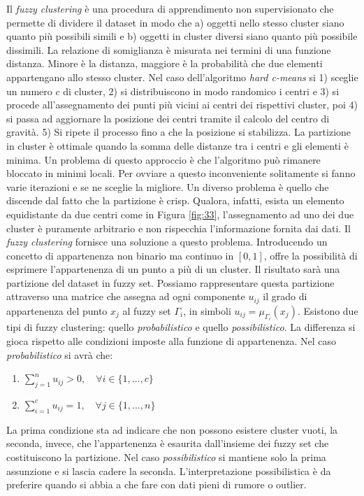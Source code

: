 \documentclass[10pt,a4paper]{article}
\begin{document}
Il \emph{fuzzy clustering} è una procedura di apprendimento non supervisionato che permette di dividere il dataset in modo che a) oggetti nello stesso cluster siano quanto più possibili simili e b) oggetti in cluster diversi siano quanto più possibile dissimili. La relazione di somiglianza è misurata nei termini di una funzione distanza. Minore è la distanza, maggiore è la probabilità che due elementi appartengano allo stesso cluster. Nel caso dell'algoritmo \emph{hard c-means} si 1) sceglie un numero $c$ di cluster, 2) si distribuiscono in modo randomico i centri e 3) si procede all'assegnamento dei punti più vicini ai centri dei rispettivi cluster, poi 4) si passa ad aggiornare la posizione dei centri tramite il calcolo del centro di gravità. 5) Si ripete il processo fino a che la posizione si stabilizza. La partizione in cluster è ottimale quando la somma delle distanze tra i centri e gli elementi è minima. Un problema di questo approccio è che l'algoritmo può rimanere bloccato in minimi locali. Per ovviare a questo inconveniente solitamente si fanno varie iterazioni e se ne sceglie la migliore. Un diverso problema è quello che discende dal fatto che la partizione è crisp. Qualora, infatti, esista un elemento equidistante da due centri come in Figura \ref{fig:33}, l'assegnamento ad uno dei due cluster è puramente arbitrario e non rispecchia l'informazione fornita dai dati. Il \emph{fuzzy clustering} fornisce una soluzione a questo problema. Introducendo un concetto di appartenenza non binario ma continuo in $[0,1]$, offre la possibilità di esprimere l'appartenenza di un punto a più di un cluster. Il risultato sarà una partizione del dataset in fuzzy set. Possiamo rappresentare questa partizione attraverso una matrice che assegna ad ogni componente $u_{ij}$ il grado di appartenenza del punto $x_j$ al fuzzy set $\Gamma_i$, in simboli $u_{ij} = \mu_{\Gamma_i}(x_j)$. Esistono due tipi di fuzzy clustering: quello \emph{probabilistico} e quello \emph{possibilistico}. La differenza si gioca rispetto alle condizioni imposte alla funzione di appartenenza. Nel caso \emph{probabilistico} si avrà che:

\begin{enumerate}
\item{$\sum_{j=1}^{n} u_{ij} > 0, \quad \forall i \in \{1,\dots,c \} $}
\item{$\sum_{i=1}^{c} u_{ij} = 1, \quad \forall j \in \{1,\dots,n \} $}
\end{enumerate}

La prima condizione sta ad indicare che non possono esistere cluster vuoti, la seconda, invece, che l'appartenenza è esaurita dall'insieme dei fuzzy set che costituiscono la partizione. Nel caso \emph{possibilistico} si mantiene solo la prima assunzione e si lascia cadere la seconda. L'interpretazione possibilistica è da preferire quando si abbia a che fare con dati pieni di rumore o outlier.
\end{document}
